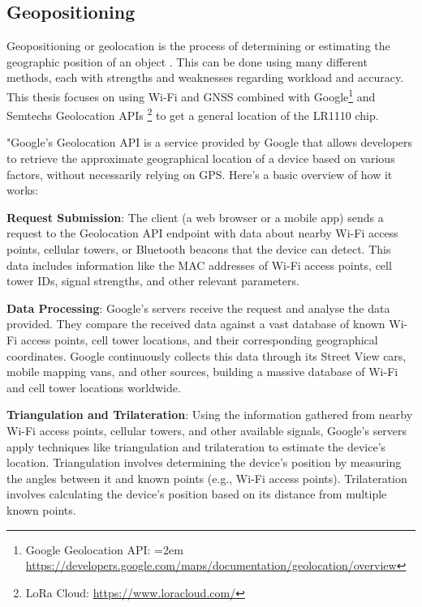 \subsection{Geopositioning}
Geopositioning or geolocation is the process of determining or estimating the geographic position of an object \cite{ISO19130}. This can be done using many different methods, each with strengths and weaknesses regarding workload and accuracy. This thesis focuses on using Wi-Fi and \ac{GNSS} combined with Google\footnote{Google Geolocation API: \hangindent=2em \url{https://developers.google.com/maps/documentation/geolocation/overview}} and Semtechs Geolocation APIs \footnote{LoRa Cloud: \url{https://www.loracloud.com/}} to get a general location of the LR1110 chip.



"Google's Geolocation API is a service provided by Google that allows developers to retrieve the approximate geographical location of a device based on various factors, without necessarily relying on \ac{GPS}. Here's a basic overview of how it works:

\textbf{Request Submission}: The client (a web browser or a mobile app) sends a request to the Geolocation API endpoint with data about nearby Wi-Fi access points, cellular towers, or Bluetooth beacons that the device can detect. This data includes information like the \ac{MAC} addresses of Wi-Fi access points, cell tower IDs, signal strengths, and other relevant parameters.

\textbf{Data Processing}: Google's servers receive the request and analyse the data provided. They compare the received data against a vast database of known Wi-Fi access points, cell tower locations, and their corresponding geographical coordinates. Google continuously collects this data through its Street View cars, mobile mapping vans, and other sources, building a massive database of Wi-Fi and cell tower locations worldwide.

\textbf{Triangulation and Trilateration}: Using the information gathered from nearby Wi-Fi access points, cellular towers, and other available signals, Google's servers apply techniques like triangulation and trilateration to estimate the device's location. Triangulation involves determining the device's position by measuring the angles between it and known points (e.g., Wi-Fi access points). Trilateration involves calculating the device's position based on its distance from multiple known points.

